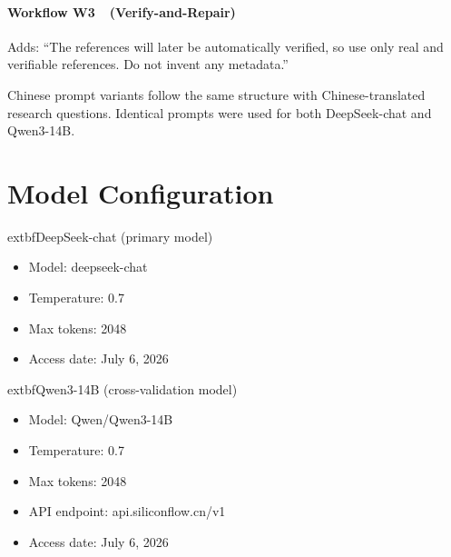 \documentclass[11pt,a4paper]{article}
\newcommand{\wthree}{W3~}
\begin{document}
\paragraph{Workflow \wthree\ (Verify-and-Repair)}
Adds: ``The references will later be automatically verified, so use only real and verifiable references. Do not invent any metadata.''


Chinese prompt variants follow the same structure with Chinese-translated research questions. Identical prompts were used for both DeepSeek-chat and Qwen3-14B.

\section{Model Configuration}

	extbf{DeepSeek-chat (primary model)}
\begin{itemize}
    \item Model: deepseek-chat
    \item Temperature: 0.7
    \item Max tokens: 2048
    \item Access date: July 6, 2026
\end{itemize}

	extbf{Qwen3-14B (cross-validation model)}
\begin{itemize}
    \item Model: Qwen/Qwen3-14B
    \item Temperature: 0.7
    \item Max tokens: 2048
    \item API endpoint: api.siliconflow.cn/v1
    \item Access date: July 6, 2026
\end{itemize}
\end{document}
